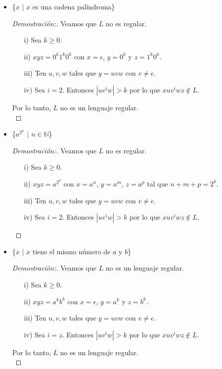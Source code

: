 \documentclass[letterpaper,11pt]{article}
\begin{document}
\begin{enumerate}
\begin{itemize}
    \item \{$x$ $|$ $x$ es una cadena palíndroma\}
    \begin{proof}[Demostración:] Veamos que $L$ no es regular.
    \begin{itemize}
    \item[i)] Sea $k \geq 0$.
    \item[ii)] $xyz = 0^{k}1^{k}0^{k}$ con $x = \epsilon$, $y = 0^{k}$ y $z = 1^{k}0^{k}$.
    \item[iii)] Ten $u,v,w$ tales que $y = uvw$ con $v \neq \epsilon$.
    \item[iv)] Sea $i=2$. Entonces $|uv^{i}w| > k$ por lo que $xuv^{i}wz \notin L$.
    \end{itemize}
    Por lo tanto, $L$ no es un lenguaje regular.\\
    \end{proof}
    \newpage
    \item \{$a^{2^{n}}$ $|$ $n \in \mathbb{N}$\}
    \begin{proof}[Demostración:] Veamos que $L$ no es regular.
    	\begin{itemize}
    		\item[i)] Sea $k \geq 0$.
    		\item[ii)] $xyz = a^{2^{k}}$ con $x= a^{n}$, 
    		$y= a^{m} $, $z = a^{p}$ tal que $n+m+p = 2^{k}$.
    		\item [iii)] Ten $u,v,w$ tales que $y = uvw$ con $v \neq \epsilon$.
    		\item[iv)] Sea $i=2$. Entonces $|uv^{i}w| > k$ por lo que 
$xuv^{i}wz \notin L$.
    	\end{itemize}
    \end{proof}
    
    \item \{$x$ $|$ $x$ tiene el mismo número de $a$ y $b$\}
    \begin{proof}[Demostración:] Veamos que $L$ no es un lenguaje regular.
    \begin{itemize}
    \item[i)] Sea $k \geq 0$.
    \item[ii)] $xyz = a^{k}b^{k}$ con $x = \epsilon$, $y = a^{k}$ y $z = b^{k}$.
    \item[iii)] Ten $u,v,w$ tales que $y = uvw$ con $v \neq \epsilon$.
    \item[iv)] Sea $i=z$. Entonces $|uv^{i}w| > k$ por lo que $xuv^{i}wz \notin L$.
    \end{itemize}
    Por lo tanto, $L$ no es un lenguaje regular.\\
    \end{proof}
    \end{itemize}
     

\end{enumerate}
\end{document}
